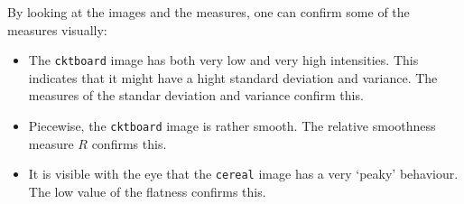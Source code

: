 By looking at the images and the measures, one can confirm some of the measures visually:
\begin{itemize}
	\item
	The \texttt{cktboard} image has both very low and very high intensities.
	This indicates that it might have a hight standard deviation and variance.
	The measures of the standar deviation and variance confirm this.

	\item
	Piecewise, the \texttt{cktboard} image is rather smooth.
	The relative smoothness measure \(R\) confirms this.

	\item
	It is visible with the eye that the \texttt{cereal} image has a very `peaky' behaviour.
	The low value of the flatness confirms this.
\end{itemize}

\clearpage